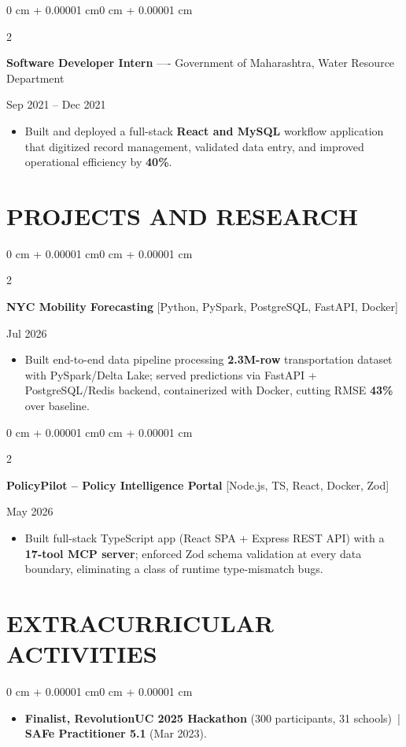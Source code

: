 \documentclass[10pt, letterpaper]{article}
\newenvironment{highlights}{
    \begin{itemize}[
        topsep=0.10 cm,
        parsep=0.06 cm,
        partopsep=0pt,
        itemsep=0.06 cm,
        leftmargin=12pt
    ]
}{
    \end{itemize}
}
\newenvironment{onecolentry}{
    \begin{adjustwidth}{0 cm + 0.00001 cm}{0 cm + 0.00001 cm}
}{
    \end{adjustwidth}
}
\newenvironment{twocolentry}[2][]{
    \onecolentry
    \def\secondColumn{#2}
    \setcolumnwidth{\fill, 4.5 cm}
    \begin{paracol}{2}
}{
    \switchcolumn \raggedleft \secondColumn
    \end{paracol}
    \endonecolentry
}
\begin{document}
\begin{twocolentry}{Sep 2021 -- Dec 2021}
\textbf{Software Developer Intern} ---- Government of Maharashtra, Water Resource Department
\end{twocolentry}
\begin{highlights}
  \item Built and deployed a full-stack \textbf{React and MySQL} workflow application that digitized record management, validated data entry, and improved operational efficiency by \textbf{40\%}.
\end{highlights}

\section{PROJECTS AND RESEARCH}
\begin{twocolentry}{Jul 2026}
\textbf{NYC Mobility Forecasting} [Python, PySpark, PostgreSQL, FastAPI, Docker]
\end{twocolentry}
\begin{highlights}
  \item Built end-to-end data pipeline processing \textbf{2.3M-row} transportation dataset with PySpark/Delta Lake; served predictions via FastAPI + PostgreSQL/Redis backend, containerized with Docker, cutting RMSE \textbf{43\%} over baseline.
\end{highlights}

\vspace{0.12 cm}

\begin{twocolentry}{May 2026}
\textbf{PolicyPilot -- Policy Intelligence Portal} [Node.js, TS, React, Docker, Zod]
\end{twocolentry}
\begin{highlights}
  \item Built full-stack TypeScript app (React SPA + Express REST API) with a \textbf{17-tool MCP server}; enforced Zod schema validation at every data boundary, eliminating a class of runtime type-mismatch bugs.
\end{highlights}

\section{EXTRACURRICULAR ACTIVITIES}
\begin{onecolentry}
\begin{highlights}
  \item \textbf{Finalist, RevolutionUC 2025 Hackathon} (300 participants, 31 schools) \,|\, \textbf{SAFe Practitioner 5.1} (Mar 2023).
\end{highlights}
\end{onecolentry}
\end{document}
